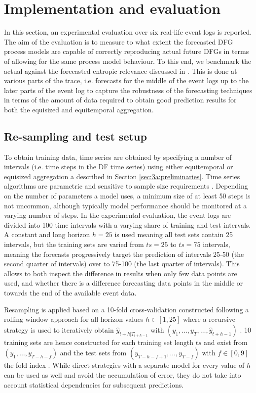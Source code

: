 \section{Implementation and evaluation}\label{sec:experiment}
In this section, an experimental evaluation over six real-life event logs is reported.
The aim of the evaluation is to measure to what extent the forecasted DFG process models are capable of correctly reproducing actual future DFGs in terms of allowing for the same process model behaviour.
To this end, we benchmark the actual against the forecasted entropic relevance discussed in .
This is done at various parts of the trace, i.e. forecasts for the middle of the event logs up to the later parts of the event log to capture the robustness of the forecasting techniques in terms of the amount of data required to obtain good prediction results for both the equisized and equitemporal aggregation.

\subsection{Re-sampling and test setup}
To obtain training data, time series are obtained by specifying a number of intervals (i.e. time steps in the DF time series) using either equitemporal or equisized aggregation a described in Section \ref{sec:3a:preliminaries}.
Time series algorithms are parametric and sensitive to sample size requirements \cite{hanke2001business}.
Depending on the number of parameters a model uses, a minimum size of at least 50 steps is not uncommon, although typically model performance should be monitored at a varying number of steps.
In the experimental evaluation, the event logs are divided into 100 time intervals with a varying share of training and test intervals. A constant and long horizon $h=25$ is used meaning all test sets contain 25 intervals, but the training sets are varied from $ts=25$ to $ts=75$ intervals, meaning the forecasts progressively target the prediction of intervals 25-50 (the second quarter of intervals) over to 75-100 (the last quarter of intervals).
This allows to both inspect the difference in results when only few data points are used, and whether there is a difference forecasting data points in the middle or towards the end of the available event data.

Resampling is applied based on a 10-fold cross-validation constructed following a rolling window approach for all horizon values $h\in[1,25]$ where a recursive strategy is used to iteratively obtain $\hat{y}_{t+h|T_{t+h-1}}$ with $(y_1,\dots,y_{T},\dots,\hat{y}_{t+h-1})$ \cite{weigend2018time}.
10 training sets are hence constructed for each training set length $ts$ and exist from $(y_1,\dots,y_{T-h-f})$ and the test sets from $(y_{T-h-f+1},\dots,y_{T-f})$ with $f\in[0,9]$ the fold index \cite{bergmeir2012use}.
While direct strategies with a separate model for every value of $h$ can be used as well and avoid the accumulation of error, they do not take into account statistical dependencies for subsequent predictions.

